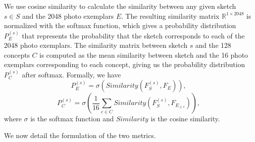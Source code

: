 \documentclass[10pt,letterpaper]{article}
\begin{document}
We use cosine similarity to calculate the similarity between any given sketch $s\in S$ and the 2048 photo exemplars $E$. The resulting similarity matrix $\mathbb{R}^{1 \times 2048}$ is normalized with the softmax function, which gives a probability distribution $P_{E}^{(s)}$ that represents the probability that the sketch corresponds to each of the 2048 photo exemplars. 
The similarity matrix between sketch $s$ and the 128 concepts $C$ is computed as the mean similarity between sketch and the 16 photo exemplars corresponding to each concept, giving us the probability distribution $P_{C}^{(s)}$ after softmax.
Formally, we have
\begin{equation}\label{eq:p exemplar}
    P_{E}^{(s)} = \sigma (Similarity(F_{S}^{(s)}, F_{E})),
\end{equation}
\begin{equation}\label{eq:p concept}
    P_{C}^{(s)} = \sigma (\frac{1}{16} \sum_{c\in C}Similarity(F_{S}^{(s)}, F_{E_{\in c}})),
\end{equation}
where $\sigma$ is the softmax function and $Similarity$ is the cosine similarity.

We now detail the formulation of the two metrics.


\end{document}
